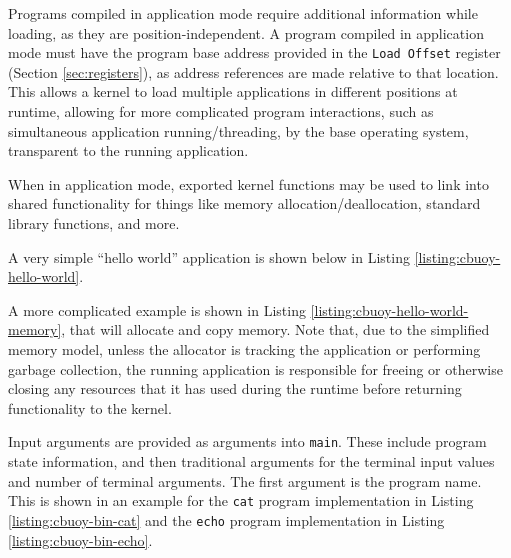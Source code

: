 \documentclass{article}
\begin{document}
Programs compiled in application mode require additional information while loading, as they are position-independent. A program compiled in application mode must have the program base address provided in the \texttt{Load Offset} register (Section \ref{sec:registers}), as address references are made relative to that location. This allows a kernel to load multiple applications in different positions at runtime, allowing for more complicated program interactions, such as simultaneous application running/threading, by the base operating system, transparent to the running application.

When in application mode, exported kernel functions may be used to link into shared functionality for things like memory allocation/deallocation, standard library functions, and more.

A very simple ``hello world'' application is shown below in Listing \ref{listing:cbuoy-hello-world}.



A more complicated example is shown in Listing \ref{listing:cbuoy-hello-world-memory}, that will allocate and copy memory. Note that, due to the simplified memory model, unless the allocator is tracking the application or performing garbage collection, the running application is responsible for freeing or otherwise closing any resources that it has used during the runtime before returning functionality to the kernel.



\pagebreak

Input arguments are provided as arguments into \texttt{main}. These include program state information, and then traditional arguments for the terminal input values and number of terminal arguments. The first argument is the program name. This is shown in an example for the \texttt{cat} program implementation in Listing \ref{listing:cbuoy-bin-cat} and the \texttt{echo} program implementation in Listing \ref{listing:cbuoy-bin-echo}.


\end{document}

